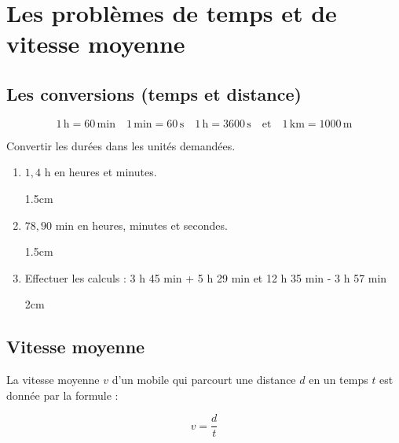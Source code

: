 \documentclass[a4paper]{book}
\begin{document}
    
\section{Les problèmes de temps et de vitesse moyenne}
\subsection{Les conversions (temps et distance)}

    \[
    1 \, \mathrm{h} = 60 \, \mathrm{min} 
    \quad 1 \, \mathrm{min} = 60 \, \mathrm{s} 
    \quad 1 \, \mathrm{h} = 3600 \, \mathrm{s}
    \quad \text{et} \quad 1 \, \mathrm{km} = 1000 \, \mathrm{m}
    \]


    \begin{exemple}
        Convertir les durées dans les unités demandées.

        \begin{enumerate}[leftmargin=*]
            \item $1,4$ h en heures et minutes.

            \begin{ZoneReponse}{1.5cm}
            \end{ZoneReponse}

            \item $78,90$ min en heures, minutes et secondes.
            
            \begin{ZoneReponse}{1.5cm}
            \end{ZoneReponse}

            \item Effectuer les calculs : 3 h 45 min + 5 h 29 min et 12 h 35 min - 3 h 57 min

            \begin{ZoneReponse}{2cm}
            \end{ZoneReponse}
        \end{enumerate}
    \end{exemple}


    
\subsection{Vitesse moyenne}
    
    \begin{definition} 
        La vitesse moyenne \( v \) d'un mobile qui parcourt une distance \( d \) en un temps \( t \) est donnée par la formule :
    
        \[
        v = \frac{d}{t}
        \]
    \end{definition}
\end{document}
